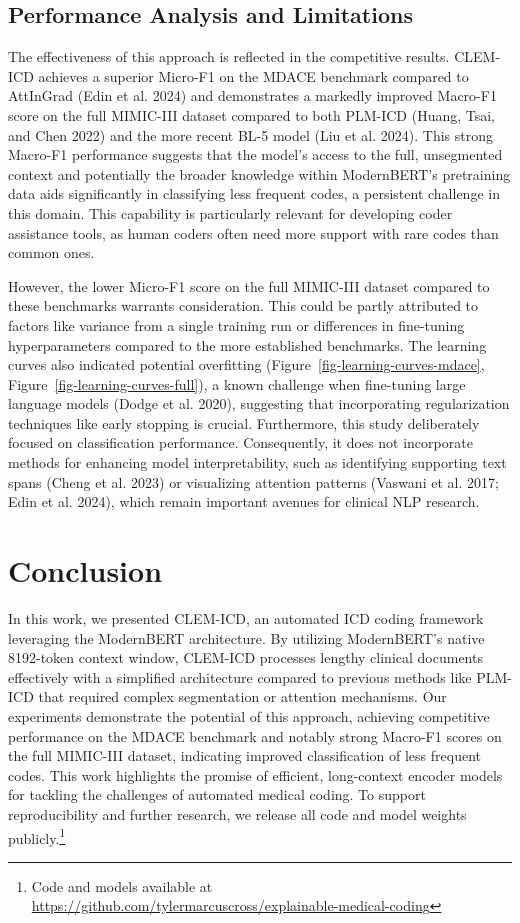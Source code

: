 \documentclass[
]{article}
\begin{document}
\subsection{Performance Analysis and
Limitations}\label{performance-analysis-and-limitations}

The effectiveness of this approach is reflected in the competitive
results. CLEM-ICD achieves a superior Micro-F1 on the MDACE benchmark
compared to AttInGrad (Edin et al. 2024) and demonstrates a markedly
improved Macro-F1 score on the full MIMIC-III dataset compared to both
PLM-ICD (Huang, Tsai, and Chen 2022) and the more recent BL-5 model (Liu
et al. 2024). This strong Macro-F1 performance suggests that the model's
access to the full, unsegmented context and potentially the broader
knowledge within ModernBERT's pretraining data aids significantly in
classifying less frequent codes, a persistent challenge in this domain.
This capability is particularly relevant for developing coder assistance
tools, as human coders often need more support with rare codes than
common ones.

However, the lower Micro-F1 score on the full MIMIC-III dataset compared
to these benchmarks warrants consideration. This could be partly
attributed to factors like variance from a single training run or
differences in fine-tuning hyperparameters compared to the more
established benchmarks. The learning curves also indicated potential
overfitting (Figure~\ref{fig-learning-curves-mdace},
Figure~\ref{fig-learning-curves-full}), a known challenge when
fine-tuning large language models (Dodge et al. 2020), suggesting that
incorporating regularization techniques like early stopping is crucial.
Furthermore, this study deliberately focused on classification
performance. Consequently, it does not incorporate methods for enhancing
model interpretability, such as identifying supporting text spans (Cheng
et al. 2023) or visualizing attention patterns (Vaswani et al. 2017;
Edin et al. 2024), which remain important avenues for clinical NLP
research.

\section{Conclusion}\label{conclusion}

In this work, we presented CLEM-ICD, an automated ICD coding framework
leveraging the ModernBERT architecture. By utilizing ModernBERT's native
8192-token context window, CLEM-ICD processes lengthy clinical documents
effectively with a simplified architecture compared to previous methods
like PLM-ICD that required complex segmentation or attention mechanisms.
Our experiments demonstrate the potential of this approach, achieving
competitive performance on the MDACE benchmark and notably strong
Macro-F1 scores on the full MIMIC-III dataset, indicating improved
classification of less frequent codes. This work highlights the promise
of efficient, long-context encoder models for tackling the challenges of
automated medical coding. To support reproducibility and further
research, we release all code and model weights publicly.\footnote{Code
  and models available at
  \url{https://github.com/tylermarcuscross/explainable-medical-coding}}
\end{document}
